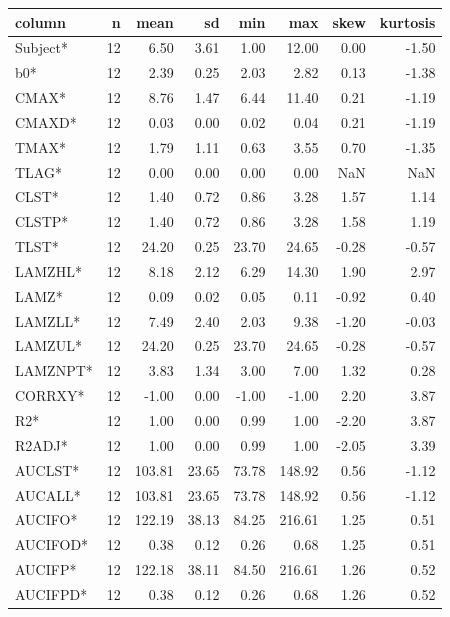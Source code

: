 \documentclass[12pt,]{krantz}
\theoremstyle{definition}
\theoremstyle{definition}
\theoremstyle{definition}
\theoremstyle{remark}
\begin{document}
\begin{tabular}{l|r|r|r|r|r|r|r}
\hline
column & n & mean & sd & min & max & skew & kurtosis\\
\hline
Subject* & 12 & 6.50 & 3.61 & 1.00 & 12.00 & 0.00 & -1.50\\
\hline
b0* & 12 & 2.39 & 0.25 & 2.03 & 2.82 & 0.13 & -1.38\\
\hline
CMAX* & 12 & 8.76 & 1.47 & 6.44 & 11.40 & 0.21 & -1.19\\
\hline
CMAXD* & 12 & 0.03 & 0.00 & 0.02 & 0.04 & 0.21 & -1.19\\
\hline
TMAX* & 12 & 1.79 & 1.11 & 0.63 & 3.55 & 0.70 & -1.35\\
\hline
TLAG* & 12 & 0.00 & 0.00 & 0.00 & 0.00 & NaN & NaN\\
\hline
CLST* & 12 & 1.40 & 0.72 & 0.86 & 3.28 & 1.57 & 1.14\\
\hline
CLSTP* & 12 & 1.40 & 0.72 & 0.86 & 3.28 & 1.58 & 1.19\\
\hline
TLST* & 12 & 24.20 & 0.25 & 23.70 & 24.65 & -0.28 & -0.57\\
\hline
LAMZHL* & 12 & 8.18 & 2.12 & 6.29 & 14.30 & 1.90 & 2.97\\
\hline
LAMZ* & 12 & 0.09 & 0.02 & 0.05 & 0.11 & -0.92 & 0.40\\
\hline
LAMZLL* & 12 & 7.49 & 2.40 & 2.03 & 9.38 & -1.20 & -0.03\\
\hline
LAMZUL* & 12 & 24.20 & 0.25 & 23.70 & 24.65 & -0.28 & -0.57\\
\hline
LAMZNPT* & 12 & 3.83 & 1.34 & 3.00 & 7.00 & 1.32 & 0.28\\
\hline
CORRXY* & 12 & -1.00 & 0.00 & -1.00 & -1.00 & 2.20 & 3.87\\
\hline
R2* & 12 & 1.00 & 0.00 & 0.99 & 1.00 & -2.20 & 3.87\\
\hline
R2ADJ* & 12 & 1.00 & 0.00 & 0.99 & 1.00 & -2.05 & 3.39\\
\hline
AUCLST* & 12 & 103.81 & 23.65 & 73.78 & 148.92 & 0.56 & -1.12\\
\hline
AUCALL* & 12 & 103.81 & 23.65 & 73.78 & 148.92 & 0.56 & -1.12\\
\hline
AUCIFO* & 12 & 122.19 & 38.13 & 84.25 & 216.61 & 1.25 & 0.51\\
\hline
AUCIFOD* & 12 & 0.38 & 0.12 & 0.26 & 0.68 & 1.25 & 0.51\\
\hline
AUCIFP* & 12 & 122.18 & 38.11 & 84.50 & 216.61 & 1.26 & 0.52\\
\hline
AUCIFPD* & 12 & 0.38 & 0.12 & 0.26 & 0.68 & 1.26 & 0.52\\
\hline

\end{tabular}
\end{document}
